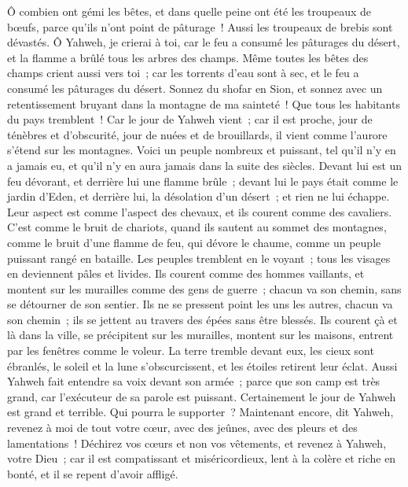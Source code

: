 \begin{multicols}{2}
Ô combien ont gémi les bêtes, et dans quelle peine ont été les troupeaux de bœufs, parce qu'ils n'ont point de pâturage~! Aussi les troupeaux de brebis sont dévastés.
Ô Yahweh, je crierai à toi, car le feu a consumé les pâturages du désert, et la flamme a brûlé tous les arbres des champs.
Même toutes les bêtes des champs crient aussi vers toi~; car les torrents d'eau sont à sec, et le feu a consumé les pâturages du désert.
\VerseOne{}Sonnez du shofar en Sion, et sonnez avec un retentissement bruyant dans la montagne de ma sainteté~! Que tous les habitants du pays tremblent~! Car le jour de Yahweh vient~; car il est proche,
jour de ténèbres et d'obscurité, jour de nuées et de brouillards, il vient comme l'aurore s'étend sur les montagnes. Voici un peuple nombreux et puissant, tel qu'il n'y en a jamais eu, et qu'il n'y en aura jamais dans la suite des siècles.
Devant lui est un feu dévorant, et derrière lui une flamme brûle~; devant lui le pays était comme le jardin d'Eden, et derrière lui, la désolation d'un désert~; et rien ne lui échappe. 
Leur aspect est comme l'aspect des chevaux, et ils courent comme des cavaliers.
C'est comme le bruit de chariots, quand ils sautent au sommet des montagnes, comme le bruit d'une flamme de feu, qui dévore le chaume, comme un peuple puissant rangé en bataille.
Les peuples tremblent en le voyant~; tous les visages en deviennent pâles et livides.
Ils courent comme des hommes vaillants, et montent sur les murailles comme des gens de guerre~; chacun va son chemin, sans se détourner de son sentier.
Ils ne se pressent point les uns les autres, chacun va son chemin~; ils se jettent au travers des épées sans être blessés.
Ils courent çà et là dans la ville, se précipitent sur les murailles, montent sur les maisons, entrent par les fenêtres comme le voleur.
La terre tremble devant eux, les cieux sont ébranlés, le soleil et la lune s'obscurcissent, et les étoiles retirent leur éclat.
Aussi Yahweh fait entendre sa voix devant son armée~; parce que son camp est très grand, car l'exécuteur de sa parole est puissant. Certainement le jour de Yahweh est grand et terrible. Qui pourra le supporter~?
Maintenant encore, dit Yahweh, revenez à moi de tout votre cœur, avec des jeûnes, avec des pleurs et des lamentations~!
Déchirez vos cœurs et non vos vêtements, et revenez à Yahweh, votre Dieu~; car il est compatissant et miséricordieux, lent à la colère et riche en bonté, et il se repent d'avoir affligé.

\end{multicols}
